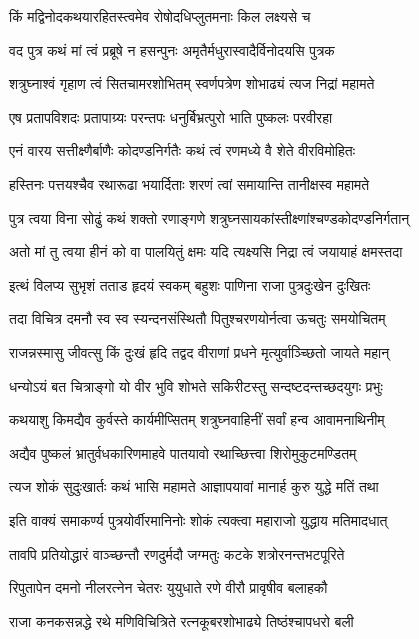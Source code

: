 \twolineshloka
{किं मद्विनोदकथयारहितस्त्वमेव}
{रोषोदधिप्लुतमनाः किल लक्ष्यसे च}%

\twolineshloka
{वद पुत्र कथं मां त्वं प्रब्रूषे न हसन्पुनः}
{अमृतैर्मधुरास्वादैर्विनोदयसि पुत्रक}%

\twolineshloka
{शत्रुघ्नाश्वं गृहाण त्वं सितचामरशोभितम्}
{स्वर्णपत्रेण शोभाढ्यं त्यज निद्रां महामते}%

\twolineshloka
{एष प्रतापविशदः प्रतापाग्र्यः परन्तपः}
{धनुर्बिभ्रत्पुरो भाति पुष्कलः परवीरहा}%

\twolineshloka
{एनं वारय सत्तीक्ष्णैर्बाणैः कोदण्डनिर्गतैः}
{कथं त्वं रणमध्ये वै शेते वीरविमोहितः}%

\twolineshloka
{हस्तिनः पत्तयश्चैव रथारूढा भयार्दिताः}
{शरणं त्वां समायान्ति तानीक्षस्व महामते}%

\twolineshloka
{पुत्र त्वया विना सोढुं कथं शक्तो रणाङ्गणे}
{शत्रुघ्नसायकांस्तीक्ष्णांश्चण्डकोदण्डनिर्गतान्}%

\twolineshloka
{अतो मां तु त्वया हीनं को वा पालयितुं क्षमः}
{यदि त्यक्ष्यसि निद्रा त्वं जयायाहं क्षमस्तदा}%

\twolineshloka
{इत्थं विलप्य सुभृशं तताड हृदयं स्वकम्}
{बहुशः पाणिना राजा पुत्रदुःखेन दुःखितः}%

\twolineshloka
{तदा विचित्र दमनौ स्व स्व स्यन्दनसंस्थितौ}
{पितुश्चरणयोर्नत्वा ऊचतुः समयोचितम्}%

\twolineshloka
{राजन्नस्मासु जीवत्सु किं दुःखं हृदि तद्वद}
{वीराणां प्रधने मृत्युर्वाञ्च्छितो जायते महान्}%

\twolineshloka
{धन्योऽयं बत चित्राङ्गो यो वीर भुवि शोभते}
{सकिरीटस्तु सन्दष्टदन्तच्छदयुगः प्रभुः}%

\twolineshloka
{कथयाशु किमद्यैव कुर्वस्ते कार्यमीप्सितम्}
{शत्रुघ्नवाहिनीं सर्वां हन्व आवामनाथिनीम्}%

\twolineshloka
{अद्यैव पुष्कलं भ्रातुर्वधकारिणमाहवे}
{पातयावो रथाच्छित्त्वा शिरोमुकुटमण्डितम्}%

\twolineshloka
{त्यज शोकं सुदुःखार्तः कथं भासि महामते}
{आज्ञापयावां मानार्ह कुरु युद्धे मतिं तथा}%

\twolineshloka
{इति वाक्यं समाकर्ण्य पुत्रयोर्वीरमानिनोः}
{शोकं त्यक्त्वा महाराजो युद्धाय मतिमादधात्}%

\twolineshloka
{तावपि प्रतियोद्धारं वाञ्च्छन्तौ रणदुर्मदौ}
{जग्मतुः कटके शत्रोरनन्तभटपूरिते}%

\twolineshloka
{रिपुतापेन दमनो नीलरत्नेन चेतरः}
{युयुधाते रणे वीरौ प्रावृषीव बलाहकौ}%

\twolineshloka
{राजा कनकसन्नद्धे रथे मणिविचित्रिते}
{रत्नकूबरशोभाढ्ये तिष्ठंश्चापधरो बली}%

